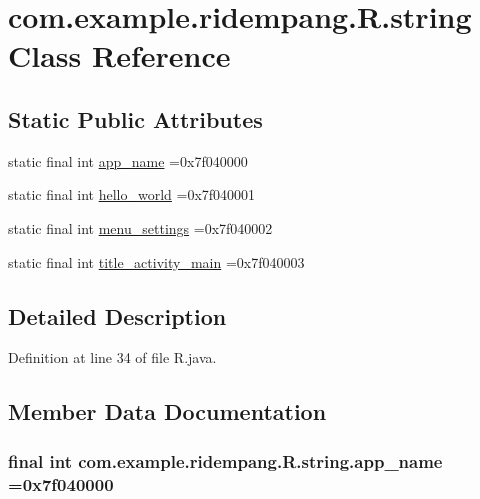 \hypertarget{classcom_1_1example_1_1ridempang_1_1_r_1_1string}{\section{com.\-example.\-ridempang.\-R.\-string Class Reference}
\label{classcom_1_1example_1_1ridempang_1_1_r_1_1string}
}
\subsection*{Static Public Attributes}
\begin{DoxyCompactItemize}
\item 
static final int \hyperlink{classcom_1_1example_1_1ridempang_1_1_r_1_1string_aaf68167f807eaa97965e784219cc1ed4}{app\-\_\-name} =0x7f040000
\item 
static final int \hyperlink{classcom_1_1example_1_1ridempang_1_1_r_1_1string_a91954e2a53dc9247168c35e58de3d850}{hello\-\_\-world} =0x7f040001
\item 
static final int \hyperlink{classcom_1_1example_1_1ridempang_1_1_r_1_1string_ad5e574ae94242252052ed48488271eb9}{menu\-\_\-settings} =0x7f040002
\item 
static final int \hyperlink{classcom_1_1example_1_1ridempang_1_1_r_1_1string_a03fd627e26d11562eb40858933fb1d48}{title\-\_\-activity\-\_\-main} =0x7f040003
\end{DoxyCompactItemize}


\subsection{Detailed Description}


Definition at line 34 of file R.\-java.



\subsection{Member Data Documentation}
\hypertarget{classcom_1_1example_1_1ridempang_1_1_r_1_1string_aaf68167f807eaa97965e784219cc1ed4}{
\subsubsection[{app\-\_\-name}]{\setlength{\rightskip}{0pt plus 5cm}final int com.\-example.\-ridempang.\-R.\-string.\-app\-\_\-name =0x7f040000\hspace{0.3cm}{\ttfamily [static]}}}\label{classcom_1_1example_1_1ridempang_1_1_r_1_1string_aaf68167f807eaa97965e784219cc1ed4}


